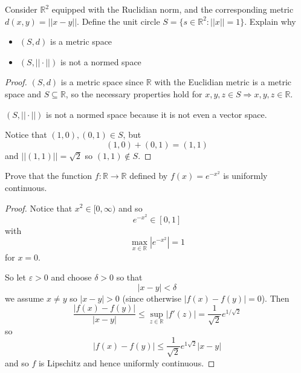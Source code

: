 \begin{prob}
    Consider $\mathbb R^2$ equipped with the Ruclidian norm, 
    and the corresponding metric $d(x,y) = ||x-y||$.
    Define the unit circle $S = \{s \in \mathbb R^2 : ||x|| = 1\}$. 
    Explain why 
    \begin{itemize}
        \item $(S,d)$ is a metric space 
        \item $(S,||\cdot||)$ is not a normed space
    \end{itemize}
\end{prob}
\begin{proof}
    $(S,d)$ is a metric space since $\mathbb R$ with the Euclidian 
    metric is a metric space and $S \subseteq \mathbb R$, so 
    the necessary properties hold for $x,y,z \in S \Rightarrow 
    x,y,z \in \mathbb R$.

    $(S,||\cdot||)$ is not a normed space because it is not even 
    a vector space. 

    Notice that $(1,0),(0,1) \in S$, but 
    \[
        (1,0) + (0,1) = (1,1)
    \]
    and $||(1,1)|| = \sqrt 2$ so $(1,1) \not\in S$.
\end{proof}
\begin{prob}
    Prove that the function $f: \mathbb R \to \mathbb R$ 
    defined by $f(x) = e^{-x^2}$ is uniformly continuous.
\end{prob}
\begin{proof}
    Notice that $x^2 \in [0,\infty)$ and so 
    \[
        e^{-x^2} \in [0,1]
    \]
    with 
    \[
        \max_{x\in\mathbb R}|e^{-x^2}| = 1
    \]
    for $x = 0$.

    So let $\varepsilon > 0$ and choose $\delta > 0$ so that 
    \[
        |x-y| < \delta
    \]
    we assume $x \neq y$ so $|x-y| > 0$ (since otherwise 
    $|f(x)-f(y)| = 0$). 
    Then 
    \[
        \frac{|f(x) - f(y)|}{|x-y|} \leq 
        \sup_{z \in \mathbb R}|f'(z)| = \frac{1}{\sqrt 2}e^{1/\sqrt 2}
    \]
    so 
    \[
        |f(x)-f(y)| \leq \frac{1}{\sqrt 2}e^{1\sqrt 2}|x-y|
    \]
    and so $f$ is Lipschitz and hence uniformly continuous.
\end{proof}

